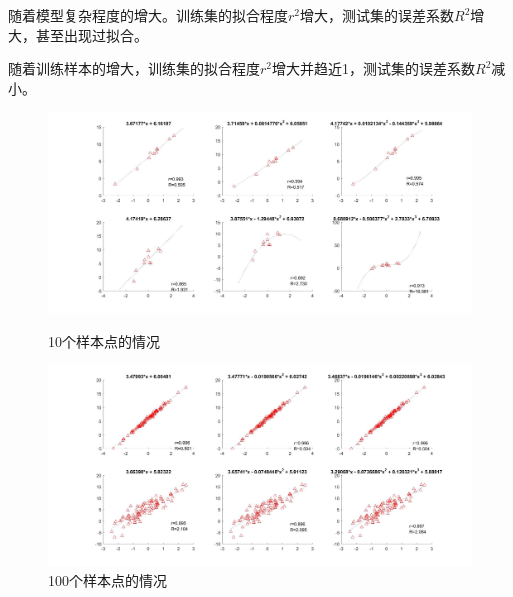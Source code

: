 \documentclass[UTF8,a4paper]{ctexart}
\begin{document}
随着模型复杂程度的增大。训练集的拟合程度$r^2$增大，测试集的误差系数$R^2$增大，甚至出现过拟合。

随着训练样本的增大，训练集的拟合程度$r^2$增大并趋近1，测试集的误差系数$R^2$减小。
\begin{figure}
\centering
\includegraphics[width=\textwidth]{prob2/10.jpg}
\caption{10个样本点的情况}
\label{10}
\includegraphics[width=\textwidth]{prob2/100.jpg}
\caption{100个样本点的情况}
\label{100}
\end{figure}
\end{document}
